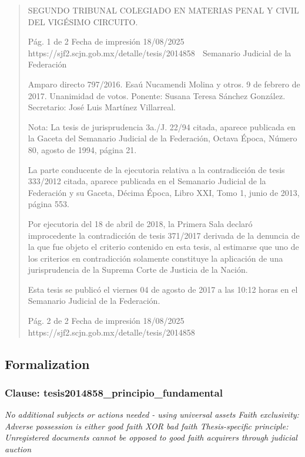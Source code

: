 \documentclass[11pt,a4paper]{article}
\begin{document}
\begin{quote}
SEGUNDO TRIBUNAL COLEGIADO EN MATERIAS PENAL Y CIVIL DEL VIGÉSIMO CIRCUITO.


                                              Pág. 1 de 2             Fecha de impresión 18/08/2025
  https://sjf2.scjn.gob.mx/detalle/tesis/2014858
                                                  Semanario Judicial de la Federación



Amparo directo 797/2016. Esaú Nucamendi Molina y otros. 9 de febrero de 2017. Unanimidad de
votos. Ponente: Susana Teresa Sánchez González. Secretario: José Luis Martínez Villarreal.

Nota: La tesis de jurisprudencia 3a./J. 22/94 citada, aparece publicada en la Gaceta del Semanario
Judicial de la Federación, Octava Época, Número 80, agosto de 1994, página 21.

La parte conducente de la ejecutoria relativa a la contradicción de tesis 333/2012 citada, aparece
publicada en el Semanario Judicial de la Federación y su Gaceta, Décima Época, Libro XXI, Tomo
1, junio de 2013, página 553.

Por ejecutoria del 18 de abril de 2018, la Primera Sala declaró improcedente la contradicción de
tesis 371/2017 derivada de la denuncia de la que fue objeto el criterio contenido en esta tesis, al
estimarse que uno de los criterios en contradicción solamente constituye la aplicación de una
jurisprudencia de la Suprema Corte de Justicia de la Nación.


Esta tesis se publicó el viernes 04 de agosto de 2017 a las 10:12 horas en el Semanario Judicial de
la Federación.




                                             Pág. 2 de 2           Fecha de impresión 18/08/2025
 https://sjf2.scjn.gob.mx/detalle/tesis/2014858

\end{quote}

\subsection{Formalization}

\subsubsection{Clause: tesis2014858\_principio\_fundamental}

\textit{No additional subjects or actions needed - using universal assets Faith exclusivity: Adverse possession is either good faith XOR bad faith Thesis-specific principle: Unregistered documents cannot be opposed to good faith acquirers through judicial auction}
\end{document}
